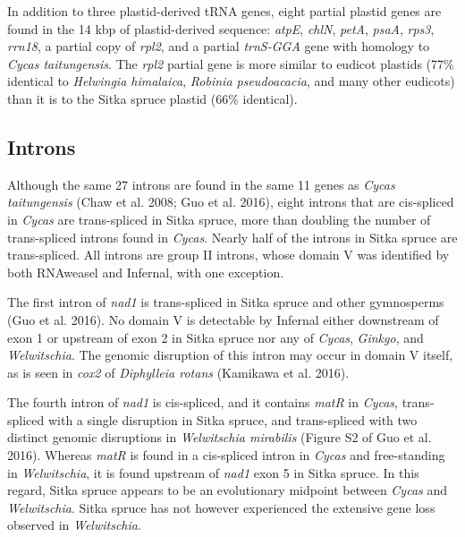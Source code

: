 \documentclass[
  12pt,
  oneside,
  openany]{book}
\begin{document}
In addition to three plastid-derived tRNA genes, eight partial plastid genes are found in the 14 kbp of plastid-derived sequence: \emph{atpE}, \emph{chlN}, \emph{petA}, \emph{psaA}, \emph{rps3}, \emph{rrn18}, a partial copy of \emph{rpl2}, and a partial \emph{trnS-GGA} gene with homology to \emph{Cycas taitungensis}. The \emph{rpl2} partial gene is more similar to eudicot plastids (77\% identical to \emph{Helwingia himalaica}, \emph{Robinia pseudoacacia}, and many other eudicots) than it is to the Sitka spruce plastid (66\% identical).

\hypertarget{introns}{%
\subsection{Introns}\label{introns}}

Although the same 27 introns are found in the same 11 genes as \emph{Cycas taitungensis} (Chaw et al. 2008; Guo et al. 2016), eight introns that are cis-spliced in \emph{Cycas} are trans-spliced in Sitka spruce, more than doubling the number of trans-spliced introns found in \emph{Cycas}. Nearly half of the introns in Sitka spruce are trans-spliced. All introns are group II introns, whose domain V was identified by both RNAweasel and Infernal, with one exception.

The first intron of \emph{nad1} is trans-spliced in Sitka spruce and other gymnosperms (Guo et al. 2016). No domain V is detectable by Infernal either downstream of exon 1 or upstream of exon 2 in Sitka spruce nor any of \emph{Cycas}, \emph{Ginkgo}, and \emph{Welwitschia}. The genomic disruption of this intron may occur in domain V itself, as is seen in \emph{cox2} of \emph{Diphylleia rotans} (Kamikawa et al. 2016).

The fourth intron of \emph{nad1} is cis-spliced, and it contains \emph{matR} in \emph{Cycas}, trans-spliced with a single disruption in Sitka spruce, and trans-spliced with two distinct genomic disruptions in \emph{Welwitschia mirabilis} (Figure S2 of Guo et al. 2016). Whereas \emph{matR} is found in a cis-spliced intron in \emph{Cycas} and free-standing in \emph{Welwitschia}, it is found upstream of \emph{nad1} exon 5 in Sitka spruce. In this regard, Sitka spruce appears to be an evolutionary midpoint between \emph{Cycas} and \emph{Welwitschia}. Sitka spruce has not however experienced the extensive gene loss observed in \emph{Welwitschia}.
\end{document}
